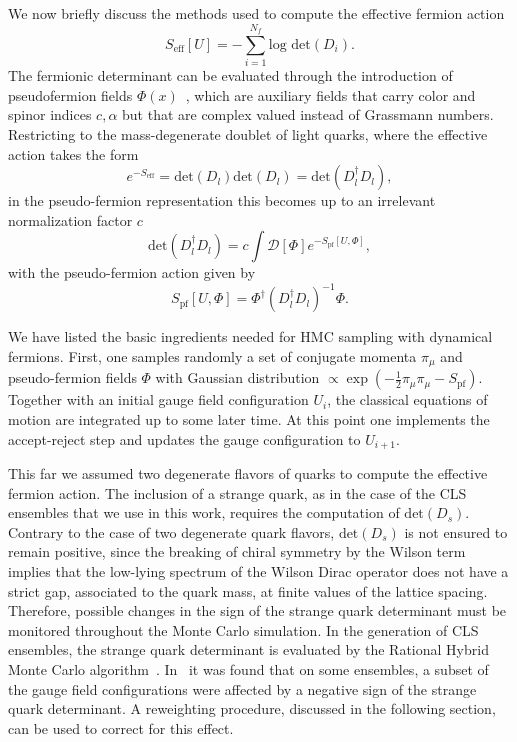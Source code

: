 We now briefly discuss the methods used to compute the effective fermion action
\begin{equation}
S_{\textrm{eff}}[U]=-\sum_{i=1}^{N_f}\textrm{log det}(D_i).
\end{equation}
The fermionic determinant can be evaluated through the introduction of pseudofermion fields $\Phi(x)$~\citep{Weingarten:1980hx}, which are auxiliary fields that carry color and spinor indices $c,\alpha$ but that are complex valued instead of Grassmann numbers. Restricting to the mass-degenerate doublet of light quarks, where the effective action takes the form
\begin{equation}
e^{-S_{\textrm{eff}}}=\textrm{det}(D_l)\textrm{det}(D_l)=\textrm{det}(D_l^{\dagger}D_l),
\end{equation}
in the pseudo-fermion representation this becomes up to an irrelevant normalization factor $c$
\begin{equation}
\textrm{det}(D_l^{\dagger}D_l)=c\int\mathcal{D}[\Phi]e^{-S_{\textrm{pf}}[U,\Phi]},
\end{equation}
with the pseudo-fermion action given by
\begin{equation}
S_{\textrm{pf}}[U,\Phi]=\Phi^{\dagger}\left(D_l^{\dagger}D_l\right)^{-1}\Phi.
\end{equation}

We have listed the basic ingredients needed for HMC sampling with dynamical fermions. First, one samples randomly a set of conjugate momenta $\pi_{\mu}$ and pseudo-fermion fields $\Phi$ with Gaussian distribution $\propto\exp\left(-\frac{1}{2}\pi_{\mu}\pi_{\mu}-S_{\textrm{pf}}\right)$. Together with an initial gauge field configuration $U_{i}$, the classical equations of motion are integrated up to some later time. At this point one implements the accept-reject step and updates the gauge configuration to $U_{i+1}$.

This far we assumed two degenerate flavors of quarks to compute the effective fermion action. The inclusion of a strange quark, as in
the case of the CLS ensembles that we use in this work, requires the computation of $\textrm{det}(D_s)$. Contrary to the case of two degenerate quark flavors, $\textrm{det}(D_s)$ is not ensured to remain positive, since the breaking of chiral symmetry by the Wilson term implies that the low-lying spectrum of the Wilson Dirac operator does not have a strict gap, associated to the quark mass, at finite values of the lattice spacing. Therefore, possible changes in the sign of the strange quark determinant must be monitored throughout the Monte Carlo simulation. In the generation of CLS ensembles, the strange quark determinant is evaluated by the Rational Hybrid Monte Carlo algorithm~\citep{Kennedy:1998cu,Clark:2006fx}. In~\citep{Mohler:2020txx} it was found that on some ensembles, a subset of the gauge field configurations  were affected by a negative sign of the strange quark determinant. A reweighting procedure, discussed in the following section, can be used to correct for this effect.

